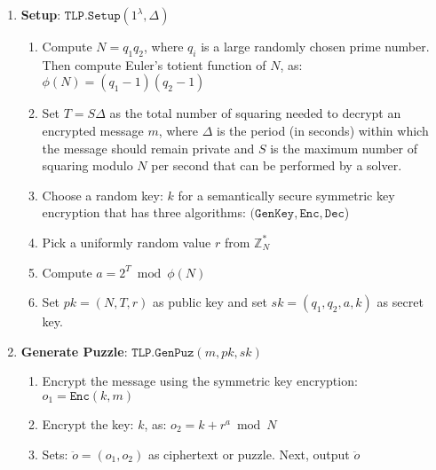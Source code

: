 \begin{enumerate}[leftmargin=.43cm]
\item \textbf{Setup}: $\mathtt{TLP.Setup}(1^{\scriptscriptstyle\lambda}, \Delta)$
\begin{enumerate}


\item Compute $N=q_{\scriptscriptstyle 1}q_{\scriptscriptstyle 2}$, where $q_{\scriptscriptstyle i}$  is a large randomly chosen prime number. Then   compute Euler's totient function of $N$, as: $\phi(N)=(q_{\scriptscriptstyle 1}-1)(q_{\scriptscriptstyle 2}-1)$ 
\item  Set  $T=S\Delta$ as the total number of squaring needed to decrypt an encrypted message $m$, where $\Delta$ is the period (in seconds) within  which the message should remain private and $S$ is the maximum  number of squaring modulo $N$ per second that can be performed by a solver. 
\item\label{TLP::pick-k}  Choose a random key: $k$ for a semantically secure symmetric key encryption   that has  three algorithms: $(\mathtt{GenKey}, \mathtt{Enc},\mathtt{Dec}$) 
\item Pick a uniformly random value $r$ from  $\mathbb{Z}^{\scriptscriptstyle *}_{\scriptscriptstyle N} $
\item Compute $a=2^{\scriptscriptstyle T}\bmod \phi(N)$
\item Set $pk=(N,T,r)$ as  public key and set $sk=(q_{\scriptscriptstyle 1},q_{\scriptscriptstyle 2},a,k)$ as secret key.
\end{enumerate}

\item\label{Generate-Puzzle-} \textbf{Generate Puzzle}: $\mathtt{TLP.GenPuz}(m,pk,sk)$ %

\begin{enumerate}
\item\label{R-TLP::enc-message}  Encrypt the message using the symmetric key encryption: $o_{\scriptscriptstyle 1}= \mathtt{Enc}(k,m)$
\item\label{TLP::mask-k} Encrypt the key: $k$, as: $o_{\scriptscriptstyle 2}= k+r^{\scriptscriptstyle a}\bmod N$
\item Sets: $\ddot{o}=(o_{\scriptscriptstyle 1},o_{\scriptscriptstyle 2})$ as ciphertext or puzzle. Next, output $\ddot{o}$
\end{enumerate}





\end{enumerate}
